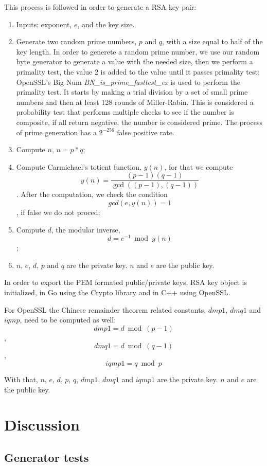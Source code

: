 \documentclass{article} %
\begin{document}
This process is followed in order to generate a RSA key-pair:
\begin{enumerate}
  \item Inputs: exponent, $e$, and the key size.
  \item Generate two random prime numbers, $p$ and $q$, with a size equal to half of the key length.
  In order to generete a random prime number, we use our random byte generator to generate
  a value with the needed size, then we perform a primality test, the value 2 is added to the value until it passes primality test;
  OpenSSL's Big Num \textit{BN\_is\_prime\_fasttest\_ex} is used to perform the primality test. It starts by making a trial division by a set of
  small prime numbers and then at least 128 rounds of Miller-Rabin. This is considered a probability
  test that performs multiple checks to see if the number is composite, if all return negative, the number is considered prime. The process of 
  prime generation has a $2^{-256}$ false positive rate.
  \item Compute $n$, $n=p*q$;
  \item Compute Carmichael's totient function, $y(n)$, for that we compute $$y(n)=\frac{(p-1)(q-1)}{\gcd((p-1),(q-1))}$$.
  After the computation, we check the condition $$gcd(e, y(n)) = 1$$, if false we do not proced;
  \item Compute $d$, the modular inverse, $$d=e^{-1} \bmod{y(n)}$$;
  \item $n$, $e$, $d$, $p$ and $q$ are the private key. $n$ and $e$ are the public key.
\end{enumerate}

In order to export the PEM formated public/private keys, RSA key object is initialized, in Go using the Crypto library and in C++ using OpenSSL.

For OpenSSL the Chinese remainder theorem related constants, $dmp1$, $dmq1$ and $iqmp$, need to be computed as well:
$$dmp1=d \bmod{(p-1)}$$, $$dmq1=d \bmod{(q-1)}$$, $$iqmp1=q \bmod{p}$$

With that, $n$, $e$, $d$, $p$, $q$, $dmp1$, $dmq1$ and $iqmp1$ are the private key. $n$ and $e$ are the public key.

\section{Discussion}
\subsection{Generator tests}
\end{document}
